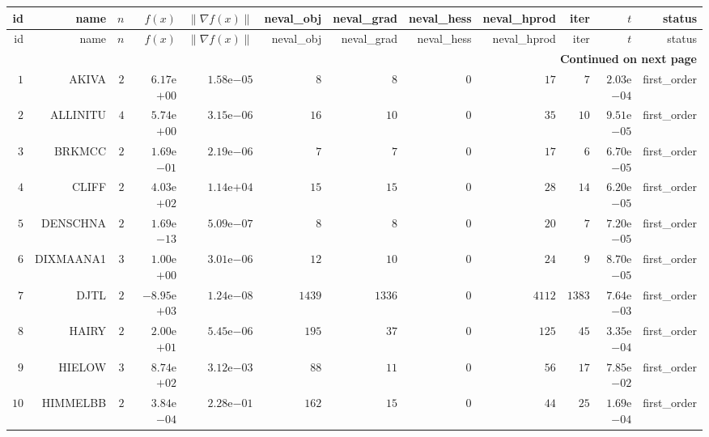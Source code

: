 \begin{longtable}{rrrrrrrrrrrr}
  \hline
  id & name & \(n\) & \(f(x)\) & \(\|\nabla f(x)\|\) & neval\_obj & neval\_grad & neval\_hess & neval\_hprod & iter & \(t\) & status \\\hline
  \endfirsthead
  \hline
  id & name & \(n\) & \(f(x)\) & \(\|\nabla f(x)\|\) & neval\_obj & neval\_grad & neval\_hess & neval\_hprod & iter & \(t\) & status \\\hline
  \endhead
  \hline
  \multicolumn{12}{r}{{\bfseries Continued on next page}}\\
  \hline
  \endfoot
  \endlastfoot
  \(     1\) & AKIVA & \(     2\) & \( 6.17\)e\(+00\) & \( 1.58\)e\(-05\) & \(     8\) & \(     8\) & \(     0\) & \(    17\) & \(     7\) & \( 2.03\)e\(-04\) & first\_order \\
  \(     2\) & ALLINITU & \(     4\) & \( 5.74\)e\(+00\) & \( 3.15\)e\(-06\) & \(    16\) & \(    10\) & \(     0\) & \(    35\) & \(    10\) & \( 9.51\)e\(-05\) & first\_order \\
  \(     3\) & BRKMCC & \(     2\) & \( 1.69\)e\(-01\) & \( 2.19\)e\(-06\) & \(     7\) & \(     7\) & \(     0\) & \(    17\) & \(     6\) & \( 6.70\)e\(-05\) & first\_order \\
  \(     4\) & CLIFF & \(     2\) & \( 4.03\)e\(+02\) & \( 1.14\)e\(+04\) & \(    15\) & \(    15\) & \(     0\) & \(    28\) & \(    14\) & \( 6.20\)e\(-05\) & first\_order \\
  \(     5\) & DENSCHNA & \(     2\) & \( 1.69\)e\(-13\) & \( 5.09\)e\(-07\) & \(     8\) & \(     8\) & \(     0\) & \(    20\) & \(     7\) & \( 7.20\)e\(-05\) & first\_order \\
  \(     6\) & DIXMAANA1 & \(     3\) & \( 1.00\)e\(+00\) & \( 3.01\)e\(-06\) & \(    12\) & \(    10\) & \(     0\) & \(    24\) & \(     9\) & \( 8.70\)e\(-05\) & first\_order \\
  \(     7\) & DJTL & \(     2\) & \(-8.95\)e\(+03\) & \( 1.24\)e\(-08\) & \(  1439\) & \(  1336\) & \(     0\) & \(  4112\) & \(  1383\) & \( 7.64\)e\(-03\) & first\_order \\
  \(     8\) & HAIRY & \(     2\) & \( 2.00\)e\(+01\) & \( 5.45\)e\(-06\) & \(   195\) & \(    37\) & \(     0\) & \(   125\) & \(    45\) & \( 3.35\)e\(-04\) & first\_order \\
  \(     9\) & HIELOW & \(     3\) & \( 8.74\)e\(+02\) & \( 3.12\)e\(-03\) & \(    88\) & \(    11\) & \(     0\) & \(    56\) & \(    17\) & \( 7.85\)e\(-02\) & first\_order \\
  \(    10\) & HIMMELBB & \(     2\) & \( 3.84\)e\(-04\) & \( 2.28\)e\(-01\) & \(   162\) & \(    15\) & \(     0\) & \(    44\) & \(    25\) & \( 1.69\)e\(-04\) & first\_order \\

\end{longtable}
